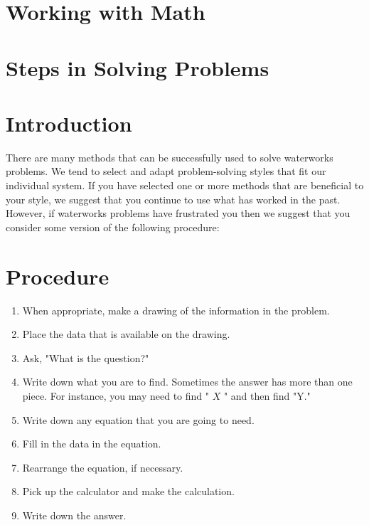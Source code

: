 \section{Working with Math}
\section{Steps in Solving Problems}
\section{Introduction}
There are many methods that can be successfully used to solve waterworks problems. We tend to select and adapt problem-solving styles that fit our individual system. If you have selected one or more methods that are beneficial to your style, we suggest that you continue to use what has worked in the past. However, if waterworks problems have frustrated you then we suggest that you consider some version of the following procedure:

\section{Procedure}
\begin{enumerate}
  \item When appropriate, make a drawing of the information in the problem.

  \item Place the data that is available on the drawing.

  \item Ask, "What is the question?"

  \item Write down what you are to find. Sometimes the answer has more than one piece. For instance, you may need to find " $X$ " and then find "Y."

  \item Write down any equation that you are going to need.

  \item Fill in the data in the equation.

  \item Rearrange the equation, if necessary.

  \item Pick up the calculator and make the calculation.

  \item Write down the answer.

\end{enumerate}
